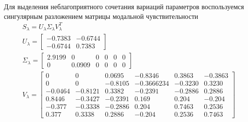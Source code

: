 Для выделения неблагоприятного сочетания вариаций параметров воспользуемся сингулярным разложением матрицы модальной чувствительности
\small
\begin{align*}
	&S_{\lambda} = U_{\lambda} \Sigma_{\lambda} V^T_{\lambda}\\
	&U_{\lambda} = \begin{bmatrix}
	  - 0.7383 & - 0.6744  \\
	- 0.6744  &  0.7383 
	\end{bmatrix}\\
	&\Sigma_{\lambda} = 
	\begin{bmatrix}
	    2.9199   & 0  &         0&    0&    0&    0\\  
		0&           0.0909   & 0&    0&    0&    0 
	\end{bmatrix}\\
	&V_{\lambda} =
	\begin{bmatrix}
	0 & 0 &   0.0695&  - 0.8346    &0.3863&  - 0.3863  \\
	0         &  0         &- 0.8105  &- 0.3666234  &- 0.3230   & 0.3230  \\
	- 0.0464 & - 0.8121 &   0.3382&  - 0.2391&  - 0.2886&    0.2886\\  
	0.8446 & - 0.3427 & - 0.2391   & 0.169  &  0.204  &- 0.204  \\
	- 0.377 & - 0.3338 & - 0.2886 &   0.204 &   0.7463 &   0.2536  \\
	0.377   & 0.3338    &0.2886  &- 0.204   & 0.2536    &0.7463 	
	\end{bmatrix}
\end{align*}
\normalsize


